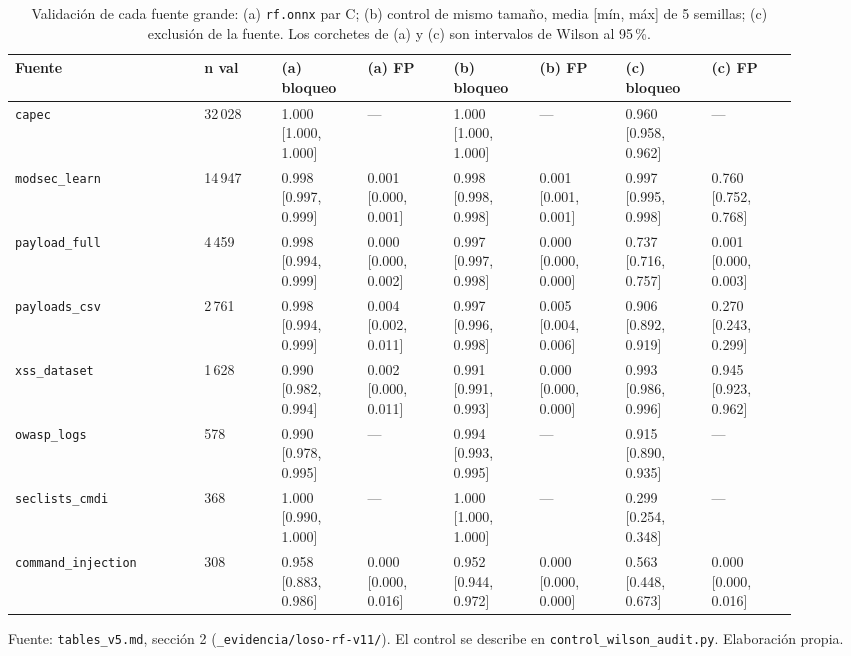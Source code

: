\begin{table}[htbp]
\centering
\footnotesize
\setlength{\tabcolsep}{2pt}
\begin{tabular}{|p{0.22\linewidth}|p{0.09\linewidth}|p{0.10\linewidth}|p{0.10\linewidth}|p{0.10\linewidth}|p{0.10\linewidth}|p{0.10\linewidth}|p{0.10\linewidth}|}
\hline
\textbf{Fuente} & \textbf{n val} & \textbf{(a) bloqueo} & \textbf{(a) FP} & \textbf{(b) bloqueo} & \textbf{(b) FP} & \textbf{(c) bloqueo} & \textbf{(c) FP} \\ \hline
\texttt{capec} & 32\,028 & 1.000 [1.000, 1.000] & — & 1.000 [1.000, 1.000] & — & 0.960 [0.958, 0.962] & — \\ \hline
\texttt{modsec\_learn} & 14\,947 & 0.998 [0.997, 0.999] & 0.001 [0.000, 0.001] & 0.998 [0.998, 0.998] & 0.001 [0.001, 0.001] & 0.997 [0.995, 0.998] & 0.760 [0.752, 0.768] \\ \hline
\texttt{payload\_full} & 4\,459 & 0.998 [0.994, 0.999] & 0.000 [0.000, 0.002] & 0.997 [0.997, 0.998] & 0.000 [0.000, 0.000] & 0.737 [0.716, 0.757] & 0.001 [0.000, 0.003] \\ \hline
\texttt{payloads\_csv} & 2\,761 & 0.998 [0.994, 0.999] & 0.004 [0.002, 0.011] & 0.997 [0.996, 0.998] & 0.005 [0.004, 0.006] & 0.906 [0.892, 0.919] & 0.270 [0.243, 0.299] \\ \hline
\texttt{xss\_dataset} & 1\,628 & 0.990 [0.982, 0.994] & 0.002 [0.000, 0.011] & 0.991 [0.991, 0.993] & 0.000 [0.000, 0.000] & 0.993 [0.986, 0.996] & 0.945 [0.923, 0.962] \\ \hline
\texttt{owasp\_logs} & 578 & 0.990 [0.978, 0.995] & — & 0.994 [0.993, 0.995] & — & 0.915 [0.890, 0.935] & — \\ \hline
\texttt{seclists\_cmdi} & 368 & 1.000 [0.990, 1.000] & — & 1.000 [1.000, 1.000] & — & 0.299 [0.254, 0.348] & — \\ \hline
\texttt{command\_injection} & 308 & 0.958 [0.883, 0.986] & 0.000 [0.000, 0.016] & 0.952 [0.944, 0.972] & 0.000 [0.000, 0.000] & 0.563 [0.448, 0.673] & 0.000 [0.000, 0.016] \\ \hline
\end{tabular}
\caption{Validación de cada fuente grande: (a) \texttt{rf.onnx} par C; (b) control de mismo tamaño, media [mín, máx] de 5 semillas; (c) exclusión de la fuente. Los corchetes de (a) y (c) son intervalos de Wilson al 95\,\%.}
\label{tabla:loso-control}
\par\smallskip\footnotesize Fuente: \texttt{tables\_v5.md}, sección 2 (\texttt{\_evidencia/loso-rf-v11/}). El control se describe en \texttt{control\_wilson\_audit.py}. Elaboración propia.
\end{table}

